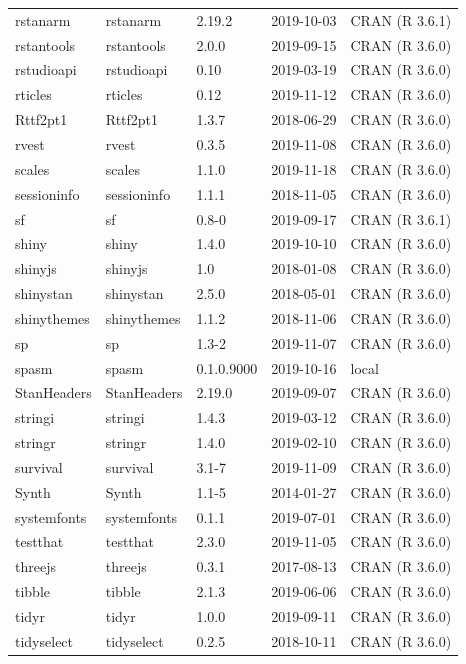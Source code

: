 \documentclass[]{article}
\begin{document}
\begin{longtable}[t]{lllll}
\addlinespace
rstanarm & rstanarm & 2.19.2 & 2019-10-03 & CRAN (R 3.6.1)\\
rstantools & rstantools & 2.0.0 & 2019-09-15 & CRAN (R 3.6.0)\\
rstudioapi & rstudioapi & 0.10 & 2019-03-19 & CRAN (R 3.6.0)\\
rticles & rticles & 0.12 & 2019-11-12 & CRAN (R 3.6.0)\\
Rttf2pt1 & Rttf2pt1 & 1.3.7 & 2018-06-29 & CRAN (R 3.6.0)\\
\addlinespace
rvest & rvest & 0.3.5 & 2019-11-08 & CRAN (R 3.6.0)\\
scales & scales & 1.1.0 & 2019-11-18 & CRAN (R 3.6.0)\\
sessioninfo & sessioninfo & 1.1.1 & 2018-11-05 & CRAN (R 3.6.0)\\
sf & sf & 0.8-0 & 2019-09-17 & CRAN (R 3.6.1)\\
shiny & shiny & 1.4.0 & 2019-10-10 & CRAN (R 3.6.0)\\
\addlinespace
shinyjs & shinyjs & 1.0 & 2018-01-08 & CRAN (R 3.6.0)\\
shinystan & shinystan & 2.5.0 & 2018-05-01 & CRAN (R 3.6.0)\\
shinythemes & shinythemes & 1.1.2 & 2018-11-06 & CRAN (R 3.6.0)\\
sp & sp & 1.3-2 & 2019-11-07 & CRAN (R 3.6.0)\\
spasm & spasm & 0.1.0.9000 & 2019-10-16 & local\\
\addlinespace
StanHeaders & StanHeaders & 2.19.0 & 2019-09-07 & CRAN (R 3.6.0)\\
stringi & stringi & 1.4.3 & 2019-03-12 & CRAN (R 3.6.0)\\
stringr & stringr & 1.4.0 & 2019-02-10 & CRAN (R 3.6.0)\\
survival & survival & 3.1-7 & 2019-11-09 & CRAN (R 3.6.0)\\
Synth & Synth & 1.1-5 & 2014-01-27 & CRAN (R 3.6.0)\\
\addlinespace
systemfonts & systemfonts & 0.1.1 & 2019-07-01 & CRAN (R 3.6.0)\\
testthat & testthat & 2.3.0 & 2019-11-05 & CRAN (R 3.6.0)\\
threejs & threejs & 0.3.1 & 2017-08-13 & CRAN (R 3.6.0)\\
tibble & tibble & 2.1.3 & 2019-06-06 & CRAN (R 3.6.0)\\
tidyr & tidyr & 1.0.0 & 2019-09-11 & CRAN (R 3.6.0)\\
\addlinespace
tidyselect & tidyselect & 0.2.5 & 2018-10-11 & CRAN (R 3.6.0)\\

\end{longtable}
\end{document}
